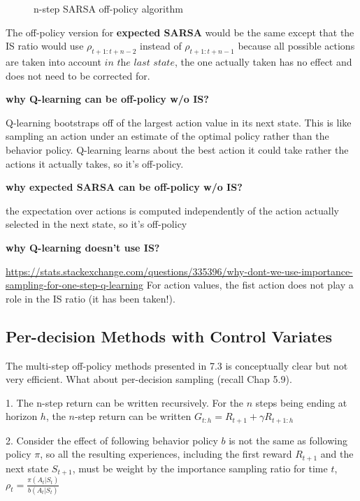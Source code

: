 \documentclass[sutton_barto_notes.tex]{subfiles}
\begin{document}
\begin{figure}[h!]
    \centering
    \caption{ n-step SARSA off-policy algorithm }
\end{figure}

The off-policy version for \textbf{expected SARSA} would be the same except that the IS ratio would use $\rho_{t+1:t+n-2}$ instead of $\rho_{t+1:t+n-1}$ because all possible actions are taken into account $\textit{in the last state}$, the one actually taken has no effect and does not need to be corrected for.

\textbf{why Q-learning can be off-policy w/o IS?}

Q-learning bootstraps off of the largest action value in its next state. This is like sampling an action under an estimate of the optimal policy rather than the behavior policy. Q-learning learns about the best action it could take rather the actions it actually takes, so it's off-policy.

\textbf{why expected SARSA can be off-policy w/o IS?}

the expectation over actions is computed independently of the action actually selected in the next state, so it's off-policy

\textbf{why Q-learning doesn't use IS?}

\url{https://stats.stackexchange.com/questions/335396/why-dont-we-use-importance-sampling-for-one-step-q-learning}
For action values, the fist action does not play a role in the IS ratio (it has been taken!).


\subsection{Per-decision Methods with Control Variates}

The multi-step off-policy methods presented in 7.3 is conceptually clear but not very efficient. What about per-decision sampling (recall Chap 5.9).

1. The n-step return can be written recursively. For the $n$ steps being ending at horizon $h$, the $n$-step return can be written $G_{t:h} = R_{t+1} + \gamma R_{t+1:h}$

2. Consider the effect of following behavior policy $b$ is not the same as following policy $\pi$, so all the resulting experiences, including the first reward $R_{t+1}$ and the next state $S_{t+1}$, must be weight by the importance sampling ratio for time $t$, $\rho_t = \frac{\pi(A_t|S_t)}{b(A_t|S_t)}$
\end{document}
